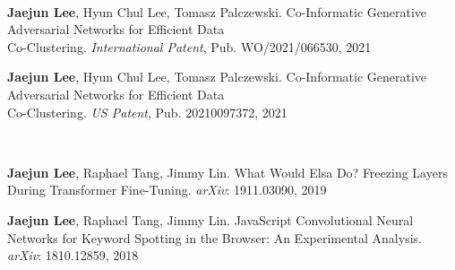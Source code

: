 \\
\begin{cvenumerate}[9]\vspace*{-0.15cm}
\item \hypertarget{CI-GAN:International}{\textcolor{gray!99!black}{\textbf{Jaejun Lee}}, Hyun Chul Lee, Tomasz Palczewski. Co-Informatic Generative Adversarial Networks for Efficient Data \\Co-Clustering. \textit{International Patent}, Pub. WO/2021/066530, 2021}
\item \hypertarget{CI-GAN:US}{\textcolor{gray!99!black}{\textbf{Jaejun Lee}}, Hyun Chul Lee, Tomasz Palczewski. Co-Informatic Generative Adversarial Networks for Efficient Data \\Co-Clustering. \textit{US Patent}, Pub. 20210097372, 2021}
\end{cvenumerate}
\hfill

\\
\begin{cvenumerate}[11]\vspace*{-0.15cm}
\item {\textcolor{gray!99!black}{\textbf{Jaejun Lee}}, Raphael Tang, Jimmy Lin. What Would Elsa Do? Freezing Layers During Transformer Fine-Tuning. \textit{arXiv}: 1911.03090, 2019}
\item {\textcolor{gray!99!black}{\textbf{Jaejun Lee}}, Raphael Tang, Jimmy Lin. JavaScript Convolutional Neural Networks for Keyword Spotting in the Browser: An Experimental Analysis. \textit{arXiv}: 1810.12859, 2018}
\end{cvenumerate}